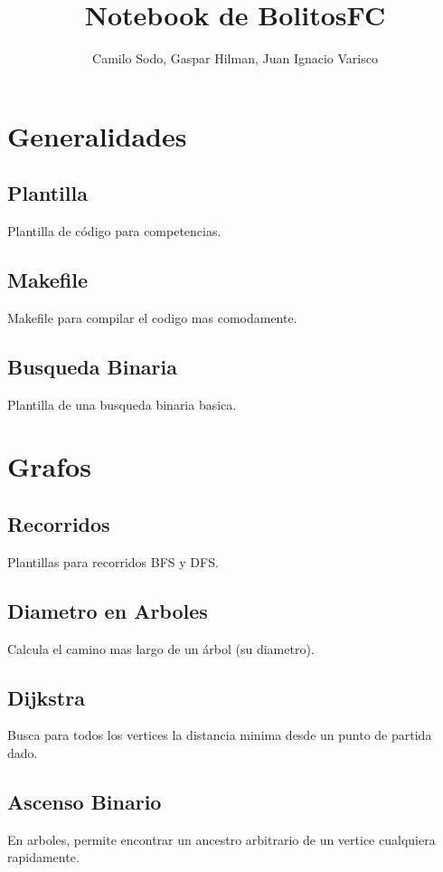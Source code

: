 \documentclass[11pt,a4paper,oneside]{book}
\newenvironment{programa}[2]{%
  \section{#1}%
  \noindent #2\par\medskip
}{%
  \medskip
}
\begin{document}
\frontmatter
\title{Notebook de BolitosFC}
\author{Camilo Sodo, Gaspar Hilman, Juan Ignacio Varisco}
\date{\the\year}
\maketitle
\tableofcontents

\mainmatter

\chapter{Generalidades}

\begin{programa}{Plantilla}{Plantilla de código para competencias.}
    
\end{programa}

\begin{programa}{Makefile}{Makefile para compilar el codigo mas comodamente.}
    
\end{programa}

\begin{programa}{Busqueda Binaria}{Plantilla de una busqueda binaria basica.}
    
\end{programa}

\chapter{Grafos}

\begin{programa}{Recorridos}{Plantillas para recorridos BFS y DFS.}
    
\end{programa}

\begin{programa}{Diametro en Arboles}{Calcula el camino mas largo de un árbol (su diametro).}
    
\end{programa}

\begin{programa}{Dijkstra}{Busca para todos los vertices la distancia minima desde un punto de partida dado.}
    
\end{programa}

\begin{programa}{Ascenso Binario}{En arboles, permite encontrar un ancestro arbitrario de un vertice cualquiera rapidamente.}
    
\end{programa}
\end{document}
